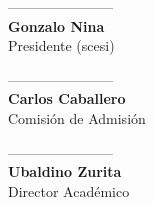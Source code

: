 \documentclass[letter,12pt]{article}
\begin{document}
\vspace{2.3cm}
\begin{minipage}{0.25\textwidth}
\begin{center}
-----------------------\\
{\bf Gonzalo Nina}\\
Presidente (scesi)\\
\end{center}
\end{minipage}
\begin{minipage}{0.47\textwidth}
\begin{center}
-----------------------\\
{\bf Carlos Caballero}\\
Comisión de Admisión
\end{center}
\end{minipage}
\begin{minipage}{0.28\textwidth}
\begin{center}
-----------------------\\
{\bf Ubaldino Zurita}\\
Director Académico\\
\end{center}
\end{minipage}
\end{document}
